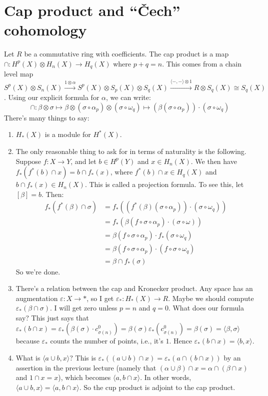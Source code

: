 \section{Cap product and ``\v{C}ech'' cohomology}
Let $R$ be a commutative ring with coefficients. The cap product is a map $\cap: H^p(X)\otimes H_n(X)\to H_{q}(X)$ where $p+q=n$. This comes from a chain level map $S^p(X)\otimes S_n(X)\xrightarrow{1\otimes\alpha} S^p(X)\otimes S_p(X)\otimes S_q(X)\xrightarrow{\langle-,-\rangle\otimes 1}R\otimes S_q(X)\cong S_q(X)$. Using our explicit formula for $\alpha$, we can write:
\begin{equation*}
\cap:\beta\otimes\sigma\mapsto\beta\otimes(\sigma\circ\alpha_p)\otimes(\sigma\circ\omega_q)\mapsto\left(\beta(\sigma\circ\alpha_p)\right)\cdot (\sigma\circ\omega_q)
\end{equation*}
There's many things to say:
\begin{enumerate}
\item $ H_\ast(X)$ is a module for $ H^\ast(X)$.
\item The only reasonable thing to ask for in terms of naturality is the following. Suppose $f:X\to Y$, and let $b\in H^p(Y)$ and $x\in H_n(X)$. We then have $f_\ast(f^\ast(b)\cap x)=b\cap f_\ast(x)$, where $f^\ast(b)\cap x\in H_q(X)$ and $b\cap f_\ast(x)\in H_n(X)$. This is called a projection formula. To see this, let $[\beta]=b$. Then:
\begin{align*}
f_\ast(f^\ast(\beta)\cap\sigma)& =f_\ast(\left(f^\ast(\beta)(\sigma\circ\alpha_p)\right)\cdot(\sigma\circ\omega_q))\\
& =f_\ast(\beta(f\circ\sigma\circ\alpha_p)\cdot(\sigma\circ\omega))\\
& =\beta(f\circ\sigma\circ\alpha_p)\cdot f_\ast(\sigma\circ\omega_q)\\
& = \beta(f\circ\sigma\circ\alpha_p)\cdot(f\circ\sigma\circ\omega_q)\\
& = \beta\cap f_\ast(\sigma)
\end{align*}
So we're done.
\item There's a relation between the cap and Kronecker product. Any space has an augmentation $\varepsilon:X\to\ast$, so I get $\varepsilon_\ast: H_\ast(X)\to R$. Maybe we should compute $\varepsilon_\ast(\beta\cap \sigma)$. I will get zero unless $p=n$ and $q=0$. What does our formula say? This just says that $\varepsilon_\ast(b\cap x)=\varepsilon_\ast(\beta(\sigma)\cdot c^0_{\sigma(n)})=\beta(\sigma)\varepsilon_\ast(c^0_{\sigma(n)})=\beta(\sigma)=\langle \beta,\sigma\rangle$ because $\varepsilon_\ast$ counts the number of points, i.e., it's $1$. Hence $\varepsilon_\ast(b\cap x)=\langle b,x\rangle$.
\item What is $\langle a\cup b,x\rangle$? This is $\varepsilon_\ast((a\cup b)\cap x)=\varepsilon_\ast(a\cap(b\cap x))$ by an assertion in the previous lecture (namely that $(\alpha\cup\beta)\cap x=\alpha\cap(\beta\cap x)$ and $1\cap x=x$), which becomes $\langle a,b\cap x\rangle$. In other words, $\langle a\cup b,x\rangle=\langle a,b\cap x\rangle$. So the cup product is adjoint to the cap product.
\end{enumerate}
